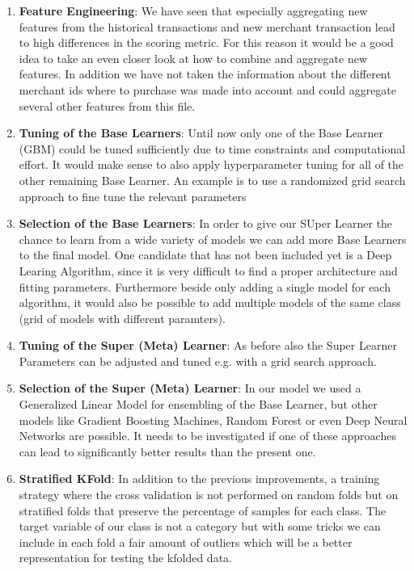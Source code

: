 \documentclass{article}
\begin{document}
\begin{enumerate}
    \item \textbf{Feature Engineering}: We have seen that especially aggregating new features from the historical transactions and new merchant transaction lead to high differences in the scoring metric. For this reason it would be a good idea to take an even closer look at how to combine and aggregate new features. In addition we have not taken the information about the different merchant ids where to purchase was made into account and could aggregate several other features from this file.
    \item \textbf{Tuning of the Base Learners}: Until now only one of the Base Learner (GBM) could be tuned sufficiently due to time constraints and computational effort. It would make sense to also apply hyperparameter tuning for all of the other remaining Base Learner. An example is to use a randomized grid search approach to fine tune the relevant parameters
    \item \textbf{Selection of the Base Learners}: In order to give our SUper Learner the chance to learn from a wide variety of models we can add more Base Learners to the final model. One candidate that has not been included yet is a Deep Learing Algorithm, since it is very difficult to find a proper architecture and fitting parameters. Furthermore beside only adding a single model for each algorithm, it would also be possible to add multiple models of the same class (grid of models with different paramters). 
    \item \textbf{Tuning of the Super (Meta) Learner}: As before also the Super Learner Parameters can be adjusted and tuned e.g. with a grid search approach.
    \item \textbf{Selection of the Super (Meta) Learner}: In our model we used a Generalized Linear Model for ensembling of the Base Learner, but other models like Gradient Boosting Machines, Random Forest or even Deep Neural Networks are possible. It needs to be investigated if one of these approaches can lead to significantly better results than the present one.
    \item \textbf{Stratified KFold}: In addition to the previous improvements, a training strategy where the cross validation is not performed on random folds but on stratified folds that preserve the percentage of samples for each class. The target variable of our class is not a category but with some tricks we can include in each fold a fair amount of outliers which will be a better representation for testing the kfolded data.

\end{enumerate}
\end{document}
